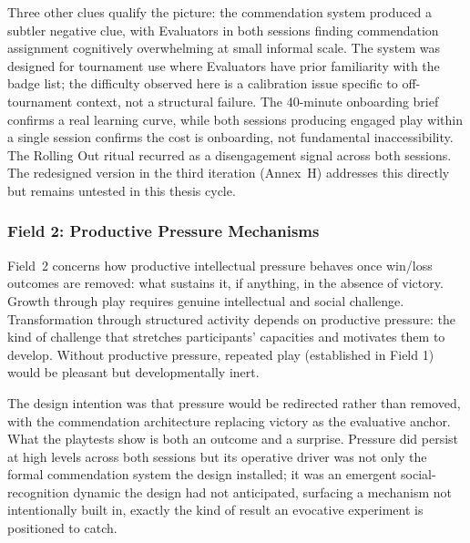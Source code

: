 Three other clues qualify the picture: the commendation system produced a subtler negative clue, with Evaluators in both sessions finding commendation assignment cognitively overwhelming at small informal scale. The system was designed for tournament use where Evaluators have prior familiarity with the badge list; the difficulty observed here is a calibration issue specific to off-tournament context, not a structural failure. The 40-minute onboarding brief confirms a real learning curve, while both sessions producing engaged play within a single session confirms the cost is onboarding, not fundamental inaccessibility. The Rolling Out ritual recurred as a disengagement signal across both sessions. The redesigned version in the third iteration (Annex~H) addresses this directly but remains untested in this thesis cycle.

\subsubsection{Field 2: Productive Pressure Mechanisms}

Field~2 concerns how productive intellectual pressure behaves once win/loss outcomes are removed: what sustains it, if anything, in the absence of victory. Growth through play requires genuine intellectual and social challenge. Transformation through structured activity depends on productive pressure: the kind of challenge that stretches participants' capacities and motivates them to develop. Without productive pressure, repeated play (established in Field 1) would be pleasant but developmentally inert.

The design intention was that pressure would be redirected rather than removed, with the commendation architecture replacing victory as the evaluative anchor. What the playtests show is both an outcome and a surprise. Pressure did persist at high levels across both sessions but its operative driver was not only the formal commendation system the design installed; it was an emergent social-recognition dynamic the design had not anticipated, surfacing a mechanism not intentionally built in, exactly the kind of result an evocative experiment is positioned to catch.

